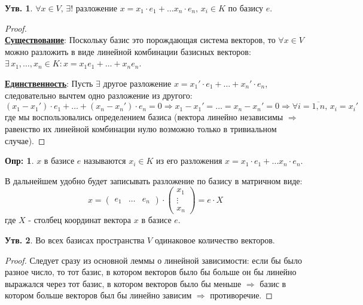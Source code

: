 \documentclass[12pt]{article}
\theoremstyle{definition}
\newtheorem{defn}{Опр:}
\newtheorem{prop}{Утв.}
\begin{document}
\begin{prop}
	$\forall x \in V, \, \exists!$ разложение $x = x_1{\cdot}e_1 + \dotsc x_n{\cdot}e_n, \, x_i \in K$ по базису $e$.
\end{prop}
\begin{proof}\hfill\\
	\textbf{\uline{Существование}}: Поскольку базис это порождающая система векторов, то $\forall x \in V$ можно разложить в виде линейной комбинации базисных векторов: $\exists\, x_1, \dotsc, x_n \in K \colon x = x_1e_1 + \dotsc + x_ne_n$.
	
	\textbf{\uline{Единственность}}: Пусть $\exists$ другое разложение $x = x_1'{\cdot}e_1 + \dotsc + x_n'{\cdot}e_n$, следовательно вычтем одно разложение из другого:
	$$
		(x_1 - x_1'){\cdot}e_1 + \dotsc + (x_n - x_n'){\cdot}e_n = 0 \Rightarrow x_1 - x_1' = \dotsc =  x_n - x_n' = 0 \Rightarrow \forall i = \overline{1, n}, \, x_i = x_i'
	$$
	где мы воспользовались определением базиса (вектора линейно независимы $\Rightarrow$ равенство их линейной комбинации нулю возможно только в тривиальном случае).
\end{proof}

\begin{defn}
	 $x$ в базисе $e$ называются $x_i \in K$ из его разложения $x = x_1{\cdot}e_1 + \dotsc x_n{\cdot}e_n$.
\end{defn}
В дальнейшем удобно будет записывать разложение по базису в матричном виде:
$$
	x = \begin{pmatrix}
		e_1 & \dotsc & e_n
	\end{pmatrix}{\cdot}
	\begin{pmatrix}
		x_1 \\
		\vdots\\
		x_n
	\end{pmatrix} = e{\cdot}X
$$
где $X$ - столбец координат вектора $x$ в базисе $e$.

\begin{prop}
	Во всех базисах пространства $V$ одинаковое количество векторов.
\end{prop}
\begin{proof}
	Следует сразу из основной леммы о линейной зависимости: если бы было разное число, то тот базис, в котором векторов было бы больше он бы линейно выражался через тот базис, в котором векторов было бы меньше $\Rightarrow$ базис в котором больше векторов был бы линейно зависим $\Rightarrow$ противоречие.
\end{proof}
\end{document}

